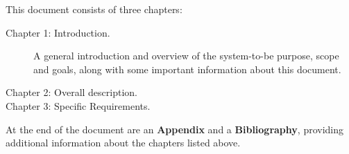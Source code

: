 This document consists of three chapters:

\begin{description}
\item[Chapter 1: Introduction.] A general introduction and overview of the system-to-be purpose, scope and goals, along with some important information about this document.
\item[Chapter 2: Overall description.]
\item[Chapter 3: Specific Requirements.]
\end{description}

At the end of the document are an \textbf{Appendix} and a \textbf{Bibliography}, providing additional information about the chapters listed above.